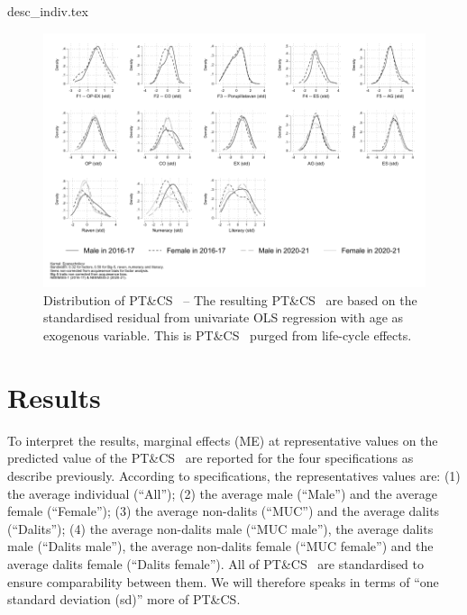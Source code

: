 \documentclass[a4paper, 11pt, onecolumn]{article}
\newcommand{\PTCS}{PT\&CS}
\begin{document}
{desc_indiv.tex}

\begin{figure}[ht]
\raggedright
\includegraphics[width=\textwidth]{INPUT/Kernel_PTCS_raw_new}
\caption{Distribution of \PTCS~ -- The resulting \PTCS~ are based on the standardised residual from univariate OLS regression with age as exogenous variable. This is \PTCS~ purged from life-cycle effects.}
\label{fig:PTCS}
\end{figure}



\section{Results}
\label{section:results}

To interpret the results, marginal effects (ME) at representative values on the predicted value of the \PTCS~ are reported for the four specifications as describe previously.
According to specifications, the representatives values are: (1) the average individual (``All''); (2) the average male (``Male'') and the average female (``Female''); (3) the average non-dalits (``MUC'') and the average dalits (``Dalits''); (4) the average non-dalits male (``MUC male''), the average dalits male (``Dalits male''), the average non-dalits female (``MUC female'') and the average dalits female (``Dalits female'').
All of \PTCS~ are standardised to ensure comparability between them.
We will therefore speaks in terms of ``one standard deviation (sd)'' more of \PTCS.
\end{document}
